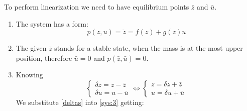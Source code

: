 \documentclass[12pt,letterpaper]{article}
\begin{document}
    To perform linearization we need to have equilibrium points $\bar z$ and $\bar u$.
    \begin{enumerate}
        \item The system has a form:
        \begin{equation}
            \label{sys:3}
            p(z, u) = \dot z = f(z) + g(z)u
        \end{equation}
        
        \item The given $\bar z$ stands for a stable state, when the mass is at the most upper position, therefore $\bar u = 0$ and $p(\bar z, \bar u) = 0$.
        
        \item Knowing 
        \begin{equation}
        \label{deltas}
            \begin{cases}
                \delta z = z - \bar z \\ 
                \delta u = u - \bar u
            \end{cases}
            \Leftrightarrow
            \begin{cases}
                z = \delta z + \bar z \\ 
                u = \delta u + \bar u
            \end{cases}
        \end{equation}
        We substitute \eqref{deltas} into \eqref{sys:3} getting:
        

\end{enumerate}
\end{document}
